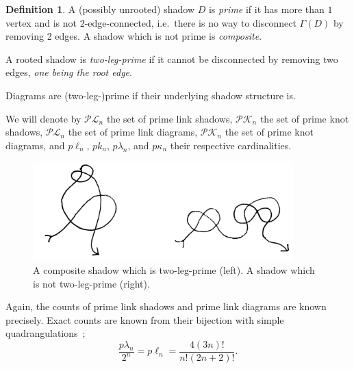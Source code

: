 \documentclass[amsmath,longbibliography,secnumarabic,floatfix,amssymb,nofootinbib,nobibnotes,letterpaper,11pt,tightenlines,notitlepage,showkeys,showlabels]{amsart}%
\newcommand{\PrimeLinkDia}{\mathcal{PL}}
\newcommand{\primelinkdia}{p\lambda}
\newcommand{\PrimeLinkShad}{\mathscr{PL}}
\newcommand{\primelinkshad}{p\ell}
\newcommand{\PrimeKnotDia}{\mathcal{PK}}
\newcommand{\primeknotdia}{p\kappa}
\newcommand{\PrimeKnotShad}{\mathscr{PK}}
\newcommand{\primeknotshad}{pk}
\newcommand{\GraphOf}[1]{\Gamma(#1)}
\newtheorem{proposition}[theorem]{Proposition}
\theoremstyle{definition}
\newtheorem*{definition}{Definition}
\begin{document}
\begin{definition}
  A (possibly unrooted) shadow $D$ is \emph{prime} if it has more than
  $1$ vertex and is not $2$-edge-connected, i.e.\ there is no way to
  disconnect $\GraphOf D$ by removing 2 edges. A shadow which is not
  prime is \emph{composite}.

  A rooted shadow is \emph{two-leg-prime} if it cannot
  be disconnected by removing two edges, \textit{one being the root
    edge}.

  Diagrams are (two-leg-)prime if their underlying shadow
  structure is.
\end{definition}

We will denote by $\PrimeLinkShad_n$ the set of prime link shadows,
$\PrimeKnotShad_n$ the set of prime knot shadows,
$\PrimeLinkDia_n$ the set of prime link diagrams, $\PrimeKnotDia_n$
the set of prime knot diagrams, and
$\primelinkshad_n$, $\primeknotshad_n$, $\primelinkdia_n$, and $\primeknotdia_n$ their respective cardinalities.

\begin{figure}[h!]  \centering
  \includegraphics[height=1.5in]{2leg_vs_reg_prime}
  \caption{A composite shadow which is two-leg-prime (left). A shadow
    which is not two-leg-prime (right). }
  \label{fig:prime2legprime}
\end{figure}

Again, the counts of prime link shadows and prime link diagrams are
known precisely. Exact counts are known from their
bijection with simple quadrangulations~\cite{AlbenqueSQT};
\[ \frac{\primelinkdia_n}{2^n} = \primelinkshad_n = \frac{4(3n)!}{n!(2n + 2)!}.\]


\end{document}
